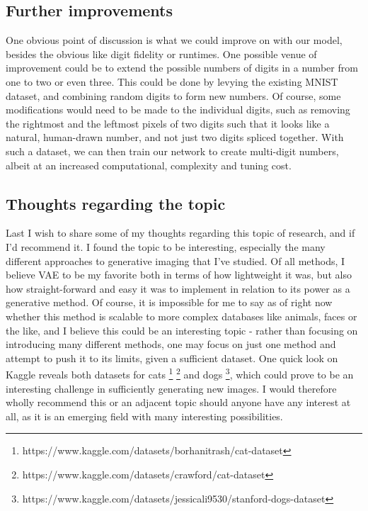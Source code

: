 \documentclass{article}
\begin{document}
\subsection{Further improvements}
One obvious point of discussion is what we could improve on with our model, besides the obvious like digit fidelity or runtimes. \newline
One possible venue of improvement could be to extend the possible numbers of digits in a number from one to two or even three. This could be done by levying the existing MNIST dataset, and combining random digits to form new numbers. Of course, some modifications would need to be made to the individual digits, such as removing the rightmost and the leftmost pixels of two digits such that it looks like a natural, human-drawn number, and not just two digits spliced together. With such a dataset, we can then train our network to create multi-digit numbers, albeit at an increased computational, complexity and tuning cost.
\subsection{Thoughts regarding the topic}
Last I wish to share some of my thoughts regarding this topic of research, and if I'd recommend it. \newline
I found the topic to be interesting, especially the many different approaches to generative imaging that I've studied. Of all methods, I believe VAE to be my favorite both in terms of how lightweight it was, but also how straight-forward and easy it was to implement in relation to its power as a generative method. Of course, it is impossible for me to say as of right now whether this method is scalable to more complex databases like animals, faces or the like, and I believe this could be an interesting topic - rather than focusing on introducing many different methods, one may focus on just one method and attempt to push it to its limits, given a sufficient dataset. One quick look on Kaggle reveals both datasets for cats \footnote{https://www.kaggle.com/datasets/borhanitrash/cat-dataset} \footnote{https://www.kaggle.com/datasets/crawford/cat-dataset} and dogs \footnote{https://www.kaggle.com/datasets/jessicali9530/stanford-dogs-dataset}, which could prove to be an interesting challenge in sufficiently generating new images. \newline
I would therefore wholly recommend this or an adjacent topic should anyone have any interest at all, as it is an emerging field with many interesting possibilities. 
\newpage
\end{document}
